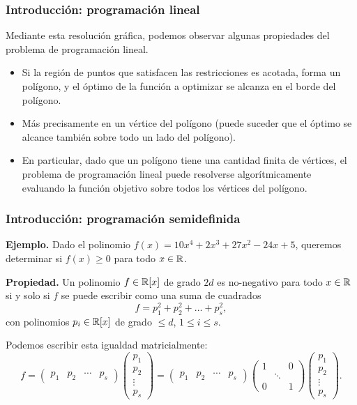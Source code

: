 \documentclass[aspectratio=169,12pt,spanish]{beamer}
\begin{document}

\begin{frame}
\frametitle{Introducción: programación lineal}

Mediante esta resolución gráfica, podemos observar algunas propiedades del problema de programación lineal.

\begin{itemize}
\item Si la región de puntos que satisfacen las restricciones es acotada, forma un polígono, y el óptimo de la función a optimizar se alcanza en el borde del polígono.
\item Más precisamente en un vértice del polígono (puede suceder que el óptimo se alcance también sobre todo un lado del polígono).
\item En particular, dado que un polígono tiene una cantidad finita de vértices, el problema de programación lineal puede resolverse algorítmicamente evaluando la función objetivo sobre todos los vértices del polígono.
\end{itemize}

\end{frame}


\begin{frame}
\frametitle{Introducción: programación semidefinida}

\textbf{Ejemplo.} Dado el polinomio  $f(x) = 10x^4+2x^3+27x^2-24x+5$, queremos determinar si $f(x) \ge 0$ para todo $x \in \mathbb{R}$.

\textbf{Propiedad.} Un polinomio $f \in \mathbb{R}[x]$ de grado $2d$ es no-negativo para todo $x \in \mathbb{R}$ si y solo si $f$ se puede escribir como una suma de cuadrados
$$
f = p_1^2 + p_2^2 +  \dots + p_s^2,
$$
con polinomios $p_i \in \mathbb{R}[x]$ de grado $\le d$, $1 \le i \le s$.

Podemos escribir esta igualdad matricialmente:
$$
f =  \begin{pmatrix}
p_1 & p_2 & \cdots & p_s \end{pmatrix}
\begin{pmatrix}
p_1 \\ p_2 \\ \vdots \\ p_s
\end{pmatrix}
=  \begin{pmatrix}
p_1 & p_2 & \cdots & p_s \end{pmatrix}
\begin{pmatrix} 1 & & 0 \\ & \ddots & \\ 0 & & 1 \end{pmatrix}
\begin{pmatrix}
p_1 \\ p_2 \\ \vdots \\ p_s
\end{pmatrix}.
$$

\end{frame}
\end{document}
